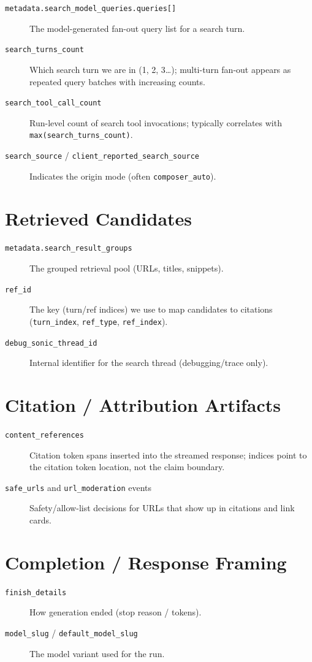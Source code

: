 \begin{description}
    \item[\texttt{metadata.search\_model\_queries.queries[]}] The model-generated fan-out query list for a search turn.
    \item[\texttt{search\_turns\_count}] Which search turn we are in (1, 2, 3\ldots); multi-turn fan-out appears as repeated query batches with increasing counts.
    \item[\texttt{search\_tool\_call\_count}] Run-level count of search tool invocations; typically correlates with \texttt{max(search\_turns\_count)}.
    \item[\texttt{search\_source} / \texttt{client\_reported\_search\_source}] Indicates the origin mode (often \texttt{composer\_auto}).
\end{description}

\section*{Retrieved Candidates}

\begin{description}
    \item[\texttt{metadata.search\_result\_groups}] The grouped retrieval pool (URLs, titles, snippets).
    \item[\texttt{ref\_id}] The key (turn/ref indices) we use to map candidates to citations (\texttt{turn\_index}, \texttt{ref\_type}, \texttt{ref\_index}).
    \item[\texttt{debug\_sonic\_thread\_id}] Internal identifier for the search thread (debugging/trace only).
\end{description}

\section*{Citation / Attribution Artifacts}

\begin{description}
    \item[\texttt{content\_references}] Citation token spans inserted into the streamed response; indices point to the citation token location, not the claim boundary.
    \item[\texttt{safe\_urls} and \texttt{url\_moderation} events] Safety/allow-list decisions for URLs that show up in citations and link cards.
\end{description}

\section*{Completion / Response Framing}

\begin{description}
    \item[\texttt{finish\_details}] How generation ended (stop reason / tokens).
    \item[\texttt{model\_slug} / \texttt{default\_model\_slug}] The model variant used for the run.
\end{description}
